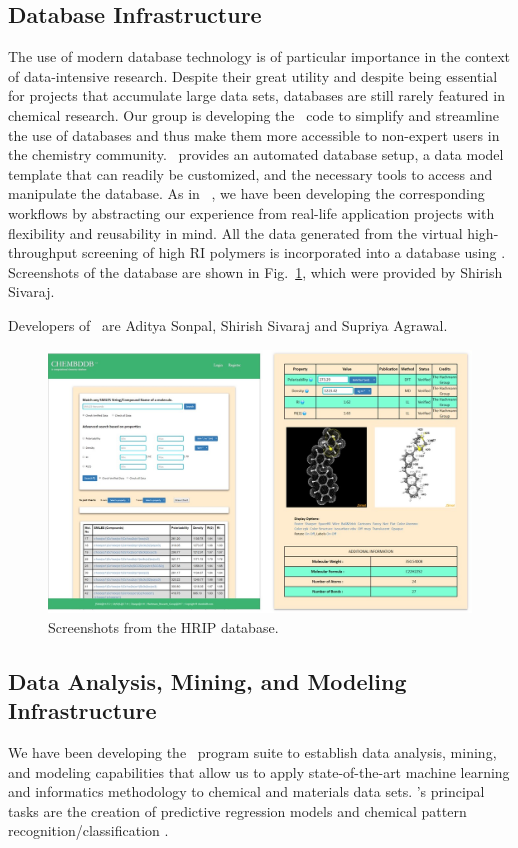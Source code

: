 \subsection{Database Infrastructure}
\label{subsec:chembddb}
The use of modern database technology is of particular importance in the context of data-intensive research. Despite their great utility and despite being essential for projects that accumulate large data sets, databases are still rarely featured in chemical research. Our group is developing the \chembddb\ code to simplify and streamline the use of databases and thus make them more accessible to non-expert users in the chemistry community. \chembddb\ provides an automated database setup, a data model template that can readily be customized, and the necessary tools to access and manipulate the database. 
As in \chemhtps\ , we have been developing the corresponding workflows by abstracting our experience from real-life application projects with flexibility and reusability in mind. All the data generated from the virtual high-throughput screening of high RI polymers is incorporated into a database using \chembddb. Screenshots of the database are shown in Fig.\ \ref{fig:chembddb_screenshot}, which were provided by Shirish Sivaraj. 

Developers of \chembddb\ are Aditya Sonpal, Shirish Sivaraj and Supriya Agrawal. 

\begin{figure}[htbp]
	\centering
	\includegraphics[width=1.0\textwidth]{Chapter-4/Figures/ChemBDDB_screeshot.jpg}
	\caption{Screenshots from the HRIP database.} 
	\label{fig:chembddb_screenshot} 
\end{figure}  

\subsection{Data Analysis, Mining, and Modeling Infrastructure}
\label{subsec:chemml}
We have been developing the \chemml\ program suite to establish data analysis, mining, and modeling capabilities that allow us to apply state-of-the-art machine learning and informatics methodology to chemical and materials data sets. \chemml 's principal tasks are the creation of predictive regression models and chemical pattern recognition/classification \cite{Kowalski1972}.

